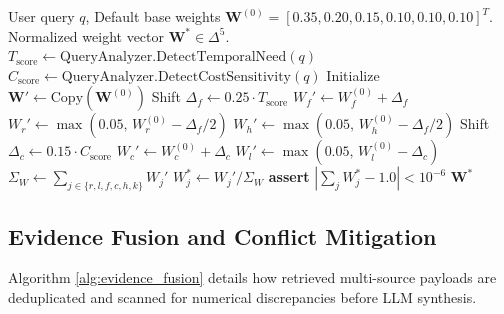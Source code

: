 \begin{algorithm}[h]
\caption{Dynamic Query-Aware Weight Generation and Simplex Projection}
\label{alg:dynamic_weights}
\begin{algorithmic}[1]
\REQUIRE User query $q$, Default base weights $\mathbf{W}^{(0)} = [0.35, 0.20, 0.15, 0.10, 0.10, 0.10]^T$.
\ENSURE Normalized weight vector $\mathbf{W}^* \in \Delta^5$.
\STATE $T_{\text{score}} \leftarrow \text{QueryAnalyzer}.\text{DetectTemporalNeed}(q)$
\STATE $C_{\text{score}} \leftarrow \text{QueryAnalyzer}.\text{DetectCostSensitivity}(q)$
\STATE Initialize $\mathbf{W}' \leftarrow \text{Copy}(\mathbf{W}^{(0)})$
    \STATE Shift $\Delta_f \leftarrow 0.25 \cdot T_{\text{score}}$
    \STATE $W_f' \leftarrow W_f^{(0)} + \Delta_f$
    \STATE $W_r' \leftarrow \max(0.05, \, W_r^{(0)} - \Delta_f / 2)$
    \STATE $W_h' \leftarrow \max(0.05, \, W_h^{(0)} - \Delta_f / 2)$
\ENDIF
{}
    \STATE Shift $\Delta_c \leftarrow 0.15 \cdot C_{\text{score}}$
    \STATE $W_c' \leftarrow W_c^{(0)} + \Delta_c$
    \STATE $W_l' \leftarrow \max(0.05, \, W_l^{(0)} - \Delta_c)$
\ENDIF
\STATE {}
\STATE $\Sigma_W \leftarrow \sum_{j \in \{r, l, f, c, h, k\}} W_j'$
    \STATE $W_j^* \leftarrow W_j' / \Sigma_W$
\ENDFOR
\STATE \textbf{assert} $|\sum_j W_j^* - 1.0| < 10^{-6}$
\RETURN $\mathbf{W}^*$
\end{algorithmic}
\end{algorithm}

\subsection{Evidence Fusion and Conflict Mitigation}
Algorithm \ref{alg:evidence_fusion} details how retrieved multi-source payloads are deduplicated and scanned for numerical discrepancies before LLM synthesis.

